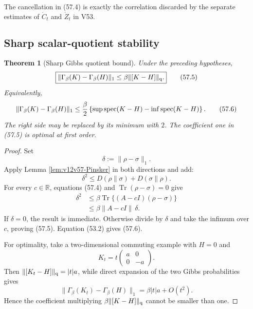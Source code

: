 \documentclass[11pt]{article}
\newtheorem{theorem}{Theorem}[section]
\theoremstyle{remark}
\begin{document}
The cancellation in (57.4) is exactly the correlation discarded by
the separate estimates of \(\dot C_t\) and \(\dot Z_t\) in V53.

\subsection{Sharp scalar-quotient stability}

\begin{theorem}[Sharp Gibbs quotient bound]
\label{thm:v12v57-sharp-Gibbs}
Under the preceding hypotheses,
\begin{equation}
 \boxed{
 \|\Gamma_\beta(K)-\Gamma_\beta(H)\|_1
 \leq
 \beta\|[K-H]\|_{\rm q}.}                         \tag{57.5}
\end{equation}
Equivalently,
\begin{equation}
 \|\Gamma_\beta(K)-\Gamma_\beta(H)\|_1
 \leq
 {\beta\over2}
 \left\{
 \sup\operatorname{spec}(K-H)
 -
 \inf\operatorname{spec}(K-H)
 \right\}.                                        \tag{57.6}
\end{equation}
The right side may be replaced by its minimum with \(2\).
The coefficient one in (57.5) is optimal at first order.
\end{theorem}

\begin{proof}
Set
\[
                         \delta:=\|\rho-\sigma\|_1.
\]
Apply Lemma \ref{lem:v12v57-Pinsker} in both directions and add:
\begin{equation}
 \delta^2
 \leq
 D(\rho\|\sigma)+D(\sigma\|\rho).                 \tag{57.7}
\end{equation}
For every \(c\in\mathbb R\), equations (57.4) and
\(\operatorname{Tr}(\rho-\sigma)=0\) give
\begin{align}
 \delta^2
 &\leq
 \beta\operatorname{Tr}\{(A-cI)(\rho-\sigma)\}
                                                        \nonumber\\
 &\leq
 \beta\|A-cI\|\,\delta.                            \tag{57.8}
\end{align}
If \(\delta=0\), the result is immediate.  Otherwise divide by
\(\delta\) and take the infimum over \(c\), proving (57.5).
Equation (53.2) gives (57.6).

For optimality, take a two-dimensional commuting example with
\(H=0\) and
\[
 K_t=t\begin{pmatrix}a&0\\0&-a\end{pmatrix}.
\]
Then \(\|[K_t-H]\|_{\rm q}=|t|a\), while direct expansion of the two
Gibbs probabilities gives
\[
 \|\Gamma_\beta(K_t)-\Gamma_\beta(H)\|_1
 =
 \beta|t|a+O(t^2).
\]
Hence the coefficient multiplying
\(\beta\|[K-H]\|_{\rm q}\) cannot be smaller than one.
\end{proof}
\end{document}
